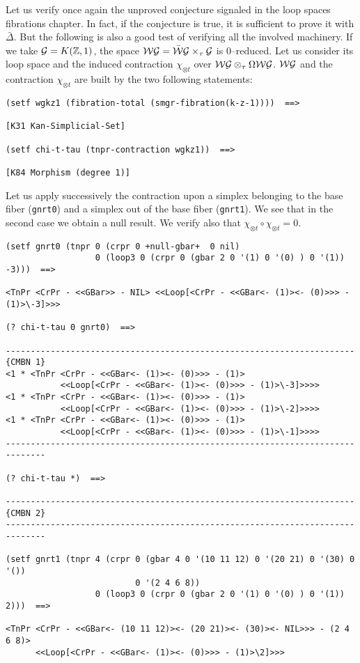 \newpage
Let us verify once again the unproved conjecture signaled in the loop spaces fibrations
chapter. In fact, if the conjecture is true, it is sufficient to prove
it with $\bar{\Delta}$. But the following is also a good test of verifying all the
involved machinery. If we take ${\cal G}= K({\mathbb{Z}},1)$, the space
${\cal WG}=\bar{\cal W}{\cal G} \times_\tau  {\cal G}$ is $0$--reduced. Let us consider
its loop space and the induced contraction $\chi_{\otimes t}$ over
${\cal WG} \otimes_\tau \Omega{\cal WG}$. ${\cal WG}$ and the contraction $\chi_{\otimes t}$
are  built by the two following statements:
{\footnotesize\begin{verbatim}
(setf wgkz1 (fibration-total (smgr-fibration(k-z-1))))  ==>

[K31 Kan-Simplicial-Set]

(setf chi-t-tau (tnpr-contraction wgkz1))  ==>

[K84 Morphism (degree 1)]
\end{verbatim}}
Let us apply successively the contraction upon  a simplex belonging to
the base fiber ({\tt gnrt0}) and a simplex out of the base fiber ({\tt gnrt1}).
We see that in the second case we obtain a null result. We verify also that
$\chi_{\otimes t}\circ \chi_{\otimes t}=0$.
{\footnotesize\begin{verbatim}
(setf gnrt0 (tnpr 0 (crpr 0 +null-gbar+  0 nil)
                  0 (loop3 0 (crpr 0 (gbar 2 0 '(1) 0 '(0) ) 0 '(1)) -3)))  ==>

<TnPr <CrPr - <<GBar>> - NIL> <<Loop[<CrPr - <<GBar<- (1)><- (0)>>> - (1)>\-3]>>>

(? chi-t-tau 0 gnrt0)  ==>

----------------------------------------------------------------------{CMBN 1}
<1 * <TnPr <CrPr - <<GBar<- (1)><- (0)>>> - (1)>
           <<Loop[<CrPr - <<GBar<- (1)><- (0)>>> - (1)>\-3]>>>>
<1 * <TnPr <CrPr - <<GBar<- (1)><- (0)>>> - (1)>
           <<Loop[<CrPr - <<GBar<- (1)><- (0)>>> - (1)>\-2]>>>>
<1 * <TnPr <CrPr - <<GBar<- (1)><- (0)>>> - (1)>
           <<Loop[<CrPr - <<GBar<- (1)><- (0)>>> - (1)>\-1]>>>>
------------------------------------------------------------------------------

(? chi-t-tau *)  ==>

----------------------------------------------------------------------{CMBN 2}
------------------------------------------------------------------------------

(setf gnrt1 (tnpr 4 (crpr 0 (gbar 4 0 '(10 11 12) 0 '(20 21) 0 '(30) 0 '())
                          0 '(2 4 6 8))
                  0 (loop3 0 (crpr 0 (gbar 2 0 '(1) 0 '(0) ) 0 '(1)) 2)))  ==>

<TnPr <CrPr - <<GBar<- (10 11 12)><- (20 21)><- (30)><- NIL>>> - (2 4 6 8)>
      <<Loop[<CrPr - <<GBar<- (1)><- (0)>>> - (1)>\2]>>>
\end{verbatim}}
